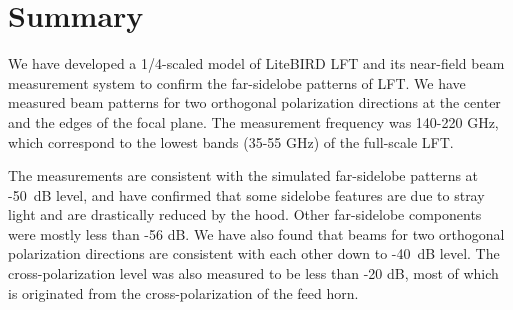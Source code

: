 \documentclass[journal]{IEEEtran}
\begin{document}
\section{Summary}
We have developed a 1/4-scaled model of LiteBIRD LFT and its near-field beam measurement system to confirm the far-sidelobe patterns of LFT. We have measured beam patterns for two orthogonal polarization directions at the center and the edges of the focal plane. The measurement frequency was 140-220 GHz, which correspond to the lowest bands (35-55 GHz) of the full-scale LFT.
\par
The measurements are consistent with the simulated far-sidelobe patterns at -50~dB level, and have confirmed that some sidelobe features are due to stray light and are drastically reduced by the hood. Other far-sidelobe components were mostly less than -56 dB. We have also found that beams for two orthogonal polarization directions are consistent with each other down to -40~dB level. The cross-polarization level was also measured to be less than -20 dB, most of which is originated from the cross-polarization of the feed horn.
%
%
%
%
%
%
%
\end{document}
